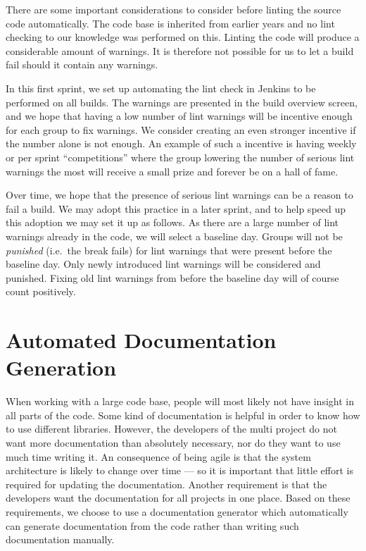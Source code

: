 There are some important considerations to consider before linting the source code automatically. The code base is inherited from earlier years and no lint checking to our knowledge was performed on this. Linting the code will produce a considerable amount of warnings. It is therefore not possible for us to let a build fail should it contain any warnings. 

In this first sprint, we set up automating the lint check in Jenkins to be performed on all builds. The warnings are presented in the build overview screen, and we hope that having a low number of lint warnings will be incentive enough for each group to fix warnings. We consider creating an even stronger incentive if the number alone is not enough. An example of such a incentive is having weekly or per sprint ``competitions'' where the group lowering the number of serious lint warnings the most will receive a small prize and forever be on a hall of fame.

Over time, we hope that the presence of serious lint warnings can be a reason to fail a build. We may adopt this practice in a later sprint, and to help speed up this adoption we may set it up as follows. As there are a large number of lint warnings already in the code, we will select a baseline day. Groups will not be \emph{punished} (i.e.\ the break fails) for lint warnings that were present before the baseline day. Only newly introduced lint warnings will be considered and punished. Fixing old lint warnings from before the baseline day will of course count positively. %



\section{Automated Documentation Generation}\label{sec:automated_documentation_gen}
When working with a large code base, people will most likely not have insight in all parts of the code. Some kind of documentation is helpful in order to know how to use different libraries. However, the developers of the multi project do not want more documentation than absolutely necessary, nor do they want to use much time writing it. An consequence of being agile is that the system architecture is likely to change over time --- so it is important that little effort is required for updating the documentation. Another requirement is that the developers want the documentation for all projects in one place. Based on these requirements, we choose to use a documentation generator which automatically can generate documentation from the code rather than writing such documentation manually.

